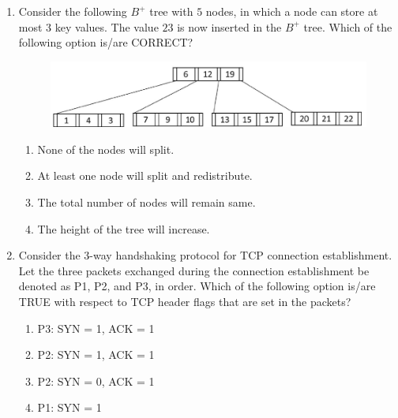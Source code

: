 \documentclass[a4paper, 11pt]{article}
\begin{document}
\begin{enumerate}
    \hfill{}

    \item Consider the following $B^{+}$ tree with $5$ nodes, in which a node can store at most $3$ key values. The value $23$ is now inserted in the $B^{+}$ tree. Which of the following option is/are CORRECT?
    \begin{figure}[H]
        \centering
        \includegraphics[width=0.7\columnwidth]{figs/q21.png}
    \end{figure}
    
    \begin{enumerate}
        \item None of the nodes will split.
        \item At least one node will split and redistribute.
        \item The total number of nodes will remain same.
        \item The height of the tree will increase.
    \end{enumerate}

    \hfill{}

    \item Consider the $3$-way handshaking protocol for TCP connection establishment. Let the three packets exchanged during the connection establishment be denoted as P1, P2, and P3, in order. Which of the following option is/are TRUE with respect to TCP header flags that are set in the packets?
    \begin{enumerate}
        \item P3: SYN = 1, ACK = 1
        \item P2: SYN = 1, ACK = 1
        \item P2: SYN = 0, ACK = 1
        \item P1: SYN = 1
    \end{enumerate}

    \hfill{}


\end{enumerate}
\end{document}
